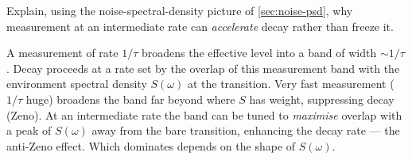 \begin{exercise}
Explain, using the noise-spectral-density picture of
\cref{sec:noise-psd}, why measurement at an intermediate rate can
\emph{accelerate} decay rather than freeze it.
\begin{solution}
A measurement of rate $1/\tau$ broadens the effective level into a
band of width $\sim1/\tau$. Decay proceeds at a rate set by the
overlap of this measurement band with the environment spectral
density $S(\omega)$ at the transition. Very fast measurement
($1/\tau$ huge) broadens the band far beyond where $S$ has weight,
suppressing decay (Zeno). At an intermediate rate the band can be
tuned to \emph{maximise} overlap with a peak of $S(\omega)$ away
from the bare transition, enhancing the decay rate --- the anti-Zeno
effect. Which dominates depends on the shape of $S(\omega)$.
\end{solution}
\end{exercise}
